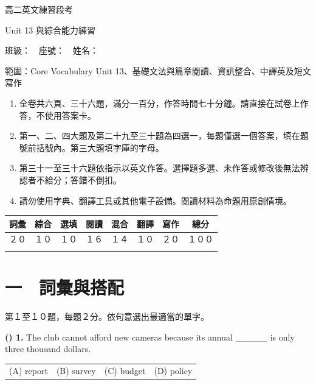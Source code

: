 \documentclass[11pt,a4paper]{article}
\newenvironment{qblock}{\par\vspace{3pt}\noindent\begin{minipage}{\linewidth}}{\end{minipage}\par\vspace{4pt}}
\begin{document}
\begin{center}{\LARGE 高二英文練習段考}\par
{\large Unit 13 與綜合能力練習}\end{center}
班級：\underline{\hspace{1.5cm}}　座號：\underline{\hspace{1cm}}　姓名：\underline{\hspace{2.2cm}}\par
範圍：Core Vocabulary Unit 13、基礎文法與篇章閱讀、資訊整合、中譯英及短文寫作
\par\smallskip
\begin{enumerate}[leftmargin=1.5em,nosep]\small
\item 全卷共六頁、三十六題，滿分一百分，作答時間七十分鐘。請直接在試卷上作答，不使用答案卡。
\item 第一、二、四大題及第二十九至三十題為四選一，每題僅選一個答案，填在題號前括號內。第三大題填字庫的字母。
\item 第三十一至三十六題依指示以英文作答。選擇題多選、未作答或修改後無法辨認者不給分；答錯不倒扣。
\item 請勿使用字典、翻譯工具或其他電子設備。閱讀材料為命題用原創情境。
\end{enumerate}
\begin{center}\small\begin{tabular}{|c|c|c|c|c|c|c|c|}\hline
詞彙 & 綜合 & 選填 & 閱讀 & 混合 & 翻譯 & 寫作 & 總分 \\ \hline
２０ & １０ & １０ & １６ & １４ & １０ & ２０ & １００ \\ \hline
\rule{0pt}{18pt} & & & & & & & \\ \hline\end{tabular}\end{center}\section*{一　詞彙與搭配}
{\small 第１至１０題，每題２分。依句意選出最適當的單字。
\par\smallskip
}
\begin{qblock}
\textbf{(\hspace{0.6cm}) 1.} The club cannot afford new cameras because its annual \_\_\_\_\_ is only three thousand dollars.
\par
\begin{tabularx}{\linewidth}{@{}XXXX@{}}
(A) report & (B) survey & (C) budget & (D) policy
\end{tabularx}
\end{qblock}
\end{document}
